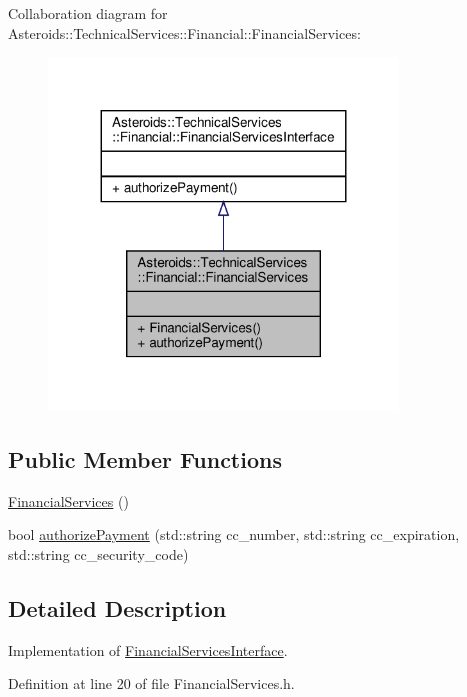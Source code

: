Collaboration diagram for Asteroids\+:\+:Technical\+Services\+:\+:Financial\+:\+:Financial\+Services\+:\nopagebreak
\begin{figure}[H]
\begin{center}
\leavevmode
\includegraphics[width=263pt]{classAsteroids_1_1TechnicalServices_1_1Financial_1_1FinancialServices__coll__graph}
\end{center}
\end{figure}
\subsection*{Public Member Functions}
\begin{DoxyCompactItemize}
\item 
\hyperlink{classAsteroids_1_1TechnicalServices_1_1Financial_1_1FinancialServices_a2ae62ef9c2b3bb0670a395ba125dc8b3}{Financial\+Services} ()
\item 
bool \hyperlink{classAsteroids_1_1TechnicalServices_1_1Financial_1_1FinancialServices_ac4f78b0a1383b8d13d2c86b8eff8c193}{authorize\+Payment} (std\+::string cc\+\_\+number, std\+::string cc\+\_\+expiration, std\+::string cc\+\_\+security\+\_\+code)
\end{DoxyCompactItemize}


\subsection{Detailed Description}
Implementation of \hyperlink{classAsteroids_1_1TechnicalServices_1_1Financial_1_1FinancialServicesInterface}{Financial\+Services\+Interface}. 

Definition at line 20 of file Financial\+Services.\+h.



